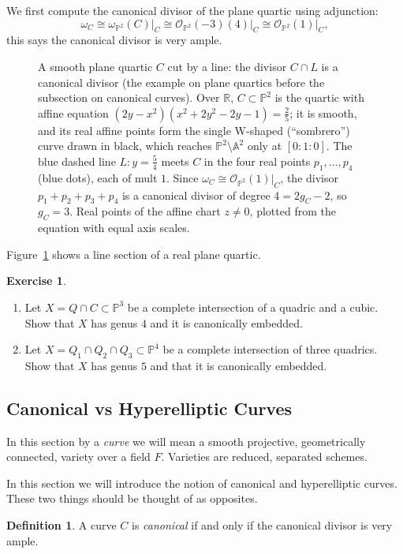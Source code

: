 \documentclass[12pt]{article}
\numberwithin{equation}{section}
\theoremstyle{definition}
\newtheorem{definition}[theorem]{Definition}
\newtheorem{exercise}[theorem]{Exercise}
\theoremstyle{remark}
\newcommand{\RR}{\mathbb{R}}
\newcommand{\Ocal}{\mathcal{O}}
\newcommand{\PP}{\mathbb{P}}
\renewcommand{\AA}{\mathbb{A}}
\begin{document}
We first compute the canonical divisor of the plane quartic using adjunction:
$$\omega_C \cong \omega_{\PP^2}(C)\vert_C \cong \Ocal_{\PP^2}(-3)(4)\vert_C \cong \Ocal_{\PP^2}(1)\vert_C,$$
this says the canonical divisor is very ample.
\begin{figure}[H]
\centering

\caption{A smooth plane quartic $C$ cut by a line: the divisor $C\cap L$ is a canonical divisor (the example on plane quartics before the subsection on canonical curves). Over $\RR$, $C\subset\PP^2$ is the quartic with affine equation $(2y-x^2)(x^2+2y^2-2y-1)=\tfrac25$; it is smooth, and its real affine points form the single W-shaped (``sombrero'') curve drawn in black, which reaches $\PP^2\setminus\AA^2$ only at $[0:1:0]$. The blue dashed line $L\colon y=\tfrac54$ meets $C$ in the four real points $p_1,\dots,p_4$ (blue dots), each of mult $1$. Since $\omega_C\cong\Ocal_{\PP^2}(1)\vert_C$, the divisor $p_1+p_2+p_3+p_4$ is a canonical divisor of degree $4=2g_C-2$, so $g_C=3$. Real points of the affine chart $z\neq0$, plotted from the equation with equal axis scales.}\label{fig:quartic-canonical}
\end{figure}
Figure~\ref{fig:quartic-canonical} shows a line section of a real plane quartic.

\begin{exercise}
	\begin{enumerate}
		\item Let $X = Q\cap C \subset \PP^3$ be a complete intersection of a quadric and a cubic. Show that $X$ has genus $4$ and it is canonically embedded. 
		\item Let $X = Q_1 \cap Q_2 \cap Q_3 \subset \PP^4$ be a complete intersection of three quadrics. Show that $X$ has genus $5$ and that it is canonically embedded. 
	\end{enumerate}
\end{exercise}

\subsection{Canonical vs Hyperelliptic Curves}
In this section by a \emph{curve} we will mean a smooth projective, geometrically connected, variety over a field $F$. 
Varieties are reduced, separated schemes. 

In this section we will introduce the notion of canonical and hyperelliptic curves. 
These two things should be thought of as opposites. 

\begin{definition}
	A curve $C$ is \emph{canonical} if and only if the canonical divisor is very ample. 	
\end{definition}
\end{document}
